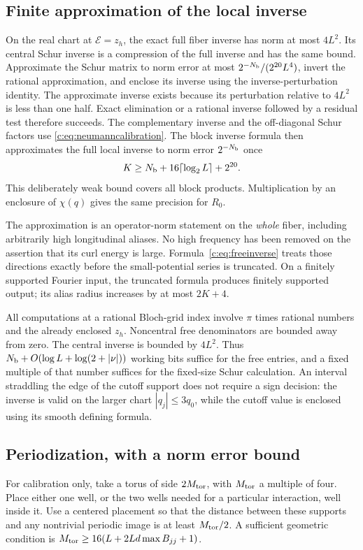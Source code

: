 \subsection{Finite approximation of the local inverse}
On the real chart at $\mathcal E=z_h$, the exact full fiber inverse has norm
at most $4L^2$. Its central Schur inverse is a compression of the
full inverse and has the same bound. Approximate the Schur matrix
to norm error at most $2^{-N_{\rm b}}/(2^{20}L^4)$, invert the rational
approximation, and enclose its inverse using the inverse-perturbation
identity. The approximate inverse exists because its perturbation
relative to $4L^2$ is less than one half. Exact elimination or a
rational inverse followed by a residual test therefore succeeds.
The complementary inverse and the off-diagonal Schur factors use
\eqref{c:eq:neumanncalibration}. The block inverse formula then
approximates the full local inverse to norm error $2^{-N_{\rm b}}$ once
\begin{equation}
 K\ge N_{\rm b}+16\lceil\log_2L\rceil+2^{20}.               \label{c:eq:NeumannN}
\end{equation}
This deliberately weak bound covers all block products. Multiplication
by an enclosure of $\chi(q)$ gives the same precision for $R_0$.

The approximation is an operator-norm statement on the \emph{whole}
fiber, including arbitrarily high longitudinal aliases. No high
frequency has been removed on the assertion that its curl energy is
large. Formula~\eqref{c:eq:freeinverse} treats those directions exactly
before the small-potential series is truncated. On a finitely supported
Fourier input, the truncated formula produces finitely supported output;
its alias radius increases by at most $2K+4$.

All computations at a rational Bloch-grid index involve $\pi$ times
rational numbers and the already enclosed $z_h$. Noncentral free
denominators are bounded away from zero. The central inverse is
bounded by $4L^2$. Thus $N_{\rm b}+O(\log L+\log(2+|\nu|))$ working bits
suffice for the free entries, and a fixed multiple of that number
suffices for the fixed-size Schur calculation. An interval straddling
the edge of the cutoff support does not require a sign decision:
the inverse is valid on the larger chart $|q_j|\le3q_0$, while the
cutoff value is enclosed using its smooth defining formula.

\subsection{Periodization, with a norm error bound}
For calibration only, take a torus of side $2M_{\rm tor}$, with $M_{\rm tor}$ a multiple
of four. Place either one well, or the two wells needed for a
particular interaction, well inside it. Use a centered placement
so that the distance between these supports and any nontrivial
periodic image is at least $M_{\rm tor}/2$. A sufficient geometric condition
is $M_{\rm tor}\ge16(L+2Ld\max B_{jj}+1)$.

